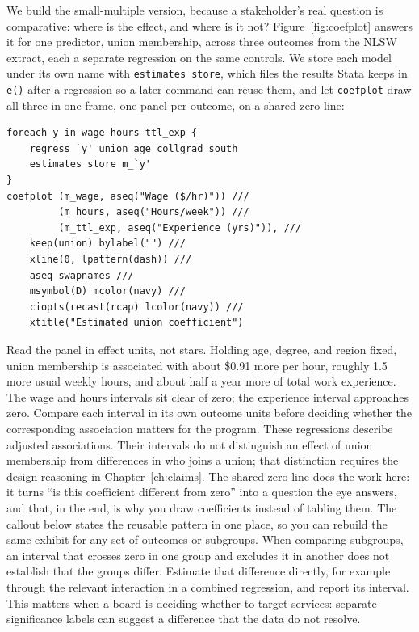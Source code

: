 \documentclass[
    a4paper,
    fontsize=10pt,
    twoside=true,
    numbers=noenddot,
]{kaobook}
\begin{document}
We build the small-multiple version, because a stakeholder's real question is comparative: where is the effect, and where is it not? Figure~\ref{fig:coefplot} answers it for one predictor, union membership, across three outcomes from the NLSW extract, each a separate regression on the same controls. We store each model under its own name with \texttt{estimates store}, which files the results Stata keeps in \texttt{e()} after a regression so a later command can reuse them, and let \texttt{coefplot} draw all three in one frame, one panel per outcome, on a shared zero line:
\par
{\footnotesize
\begin{verbatim}
foreach y in wage hours ttl_exp {
    regress `y' union age collgrad south
    estimates store m_`y'
}
coefplot (m_wage, aseq("Wage ($/hr)")) ///
         (m_hours, aseq("Hours/week")) ///
         (m_ttl_exp, aseq("Experience (yrs)")), ///
    keep(union) bylabel("") ///
    xline(0, lpattern(dash)) ///
    aseq swapnames ///
    msymbol(D) mcolor(navy) ///
    ciopts(recast(rcap) lcolor(navy)) ///
    xtitle("Estimated union coefficient")
\end{verbatim}
}

Read the panel in effect units, not stars. Holding age, degree, and region fixed, union membership is associated with about \$0.91 more per hour, roughly 1.5 more usual weekly hours, and about half a year more of total work experience. The wage and hours intervals sit clear of zero; the experience interval approaches zero. Compare each interval in its own outcome units before deciding whether the corresponding association matters for the program. These regressions describe adjusted associations. Their intervals do not distinguish an effect of union membership from differences in who joins a union; that distinction requires the design reasoning in Chapter~\ref{ch:claims}. The shared zero line does the work here: it turns \enquote{is this coefficient different from zero} into a question the eye answers, and that, in the end, is why you draw coefficients instead of tabling them. The callout below states the reusable pattern in one place, so you can rebuild the same exhibit for any set of outcomes or subgroups. When comparing subgroups, an interval that crosses zero in one group and excludes it in another does not establish that the groups differ. Estimate that difference directly, for example through the relevant interaction in a combined regression, and report its interval. This matters when a board is deciding whether to target services: separate significance labels can suggest a difference that the data do not resolve.
\end{document}
